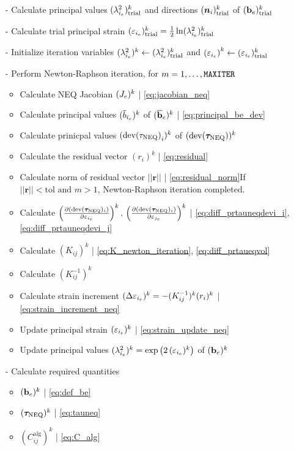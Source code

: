 \begin{itemize}
    \item[-] Calculate principal values \(({\lambda^{2}_{{i}_e}})_\text{trial}^{k}\) and directions \(({\bm{n}_{i}})_\text{trial}^{k}\) of \(({\mathbf{b}_{e}})_\text{trial}^{k}\)
    \item[-] Calculate trial principal strain \(({\varepsilon_{{i}_e}})_\text{trial}^{k}  = \frac{1}{2} \ln({\lambda^{2}_{{i}_e}})_\text{trial}^{k} \)
    \item[-] Initialize iteration variables \((\lambda^{2}_{{i}_e})^{k} \leftarrow ({\lambda^{2}_{{i}_e}})_\text{trial}^{k}\) and \({(\varepsilon_{{i}_e})}^{k} \leftarrow ({\varepsilon_{{i}_e}})_\text{trial}^{k}\)
    \item[-] Perform Newton-Raphson iteration, for \(m = 1, \ldots, \text{\texttt{MAXITER}}\)
    \begin{itemize}
        \item Calculate NEQ Jacobian \(({J_{e}})^{k}\) \hfill | \cref{eq:jacobian_neq}
        \item Calculate principal values \((\overline{b}_{{i}_e})^{k}\) of \((\mathbf{\overline{b}}_{e})^{k}\) \hfill | \cref{eq:principal_be_dev}
        \item Calculate prinicpal values \(({{\text{dev}({\tau}_{\text{NEQ}})}_{i}})^{k}\) of \((\text{dev}(\bm{\tau}_{\text{NEQ}}))^{k}\)
        \item Calculate the residual vector \((r_{i})^k\) \hfill | \cref{eq:residual}
        \item Calculate norm of residual vector \(||\bm{r}||\) \hfill | \cref{eq:residual_norm}\newline If \(||\bm{r}||< \text{tol and } m>1\), Newton-Raphson iteration completed. 
        \item Calculate \(\left(\pdv{(\text{dev}(\bm{\tau}_{\text{NEQ}})_{i})}{\varepsilon_{{i}_e}}\right)^{k}, \,\left(\pdv{(\text{dev}(\bm{\tau}_{\text{NEQ}})_{i})}{\varepsilon_{{j}_e}}\right)^{k}\) | \cref{eq:diff_prtauneqdevi_i}, \cref{eq:diff_prtauneqdevi_j}
        \item Calculate \((K_{ij})^{k}\) \hfill | \cref{eq:K_newton_iteration}, \cref{eq:diff_prtaueqvol}
        \item Calculate \((K^{-1}_{ij})^{k}\)
        \item Calculate strain increment \((\Delta \varepsilon_{{i}_e})^{k}  = - (K^{-1}_{ij})^{k} (r_{i})^k\) \hfill | \cref{eq:strain_increment_neq}
        \item Update principal strain \((\varepsilon_{{i}_e})^{k}\) \hfill | \cref{eq:strain_update_neq}
        \item Update principal values \(({\lambda^{2}_{{i}_e}})^{k} = \exp\left(2\,(\varepsilon_{{i}_e})^{k}\right)\) of \((\mathbf{b}_{e})^{k}\) 
    \end{itemize}
    \item[-] Calculate required quantities
    \begin{itemize}
        \item \(({\mathbf{b}_{e}})^{k}\) \hfill | \cref{eq:def_be}
        \item \(({\bm{\tau}_{\text{NEQ}}})^{k}\) \hfill | \cref{eq:tauneq} 
        \item \((C^{\text{alg}}_{ij})^{k}\) \hfill | \cref{eq:C_alg}
    \end{itemize}
\end{itemize}
